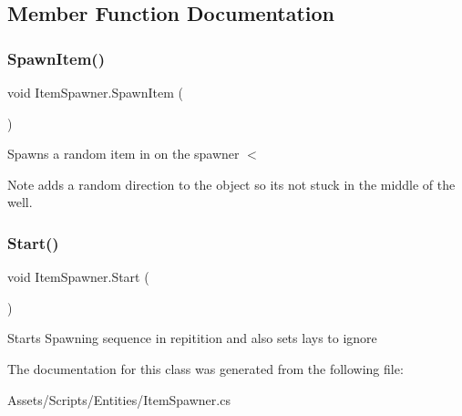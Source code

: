 \subsection{Member Function Documentation}
\mbox{\label{class_item_spawner_a2103c51aae4e7fbf8187e91767b2660c}} 
\subsubsection{\texorpdfstring{Spawn\+Item()}{SpawnItem()}}
{\footnotesize\ttfamily void Item\+Spawner.\+Spawn\+Item (\begin{DoxyParamCaption}{ }\end{DoxyParamCaption})\hspace{0.3cm}{\ttfamily [private]}}

Spawns a random item in on the spawner $<$ \begin{DoxyNote}{Note}
adds a random direction to the object so it\textquotesingle{}s not stuck in the middle of the well. 
\end{DoxyNote}
\mbox{\label{class_item_spawner_a8747f1740ce252a8676120567abd16e6}} 
\subsubsection{\texorpdfstring{Start()}{Start()}}
{\footnotesize\ttfamily void Item\+Spawner.\+Start (\begin{DoxyParamCaption}{ }\end{DoxyParamCaption})\hspace{0.3cm}{\ttfamily [private]}}

Starts Spawning sequence in repitition and also sets lays to ignore 

The documentation for this class was generated from the following file\+:\begin{DoxyCompactItemize}
\item 
Assets/\+Scripts/\+Entities/Item\+Spawner.\+cs\end{DoxyCompactItemize}
